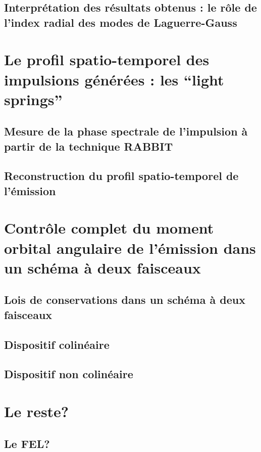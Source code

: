 \subsection{Interprétation des résultats obtenus : le rôle de l'index radial des modes de Laguerre-Gauss}

\section{Le profil spatio-temporel des impulsions générées : les ``light springs''}
\subsection{Mesure de la phase spectrale de l'impulsion à partir de la technique RABBIT}
\subsection{Reconstruction du profil spatio-temporel de l'émission}

\section{Contrôle complet du moment orbital angulaire de l'émission dans un schéma à deux faisceaux}
\subsection{Lois de conservations dans un schéma à deux faisceaux}
\subsection{Dispositif colinéaire}
\subsection{Dispositif non colinéaire}

\section{Le reste?}
\subsection{Le FEL?}